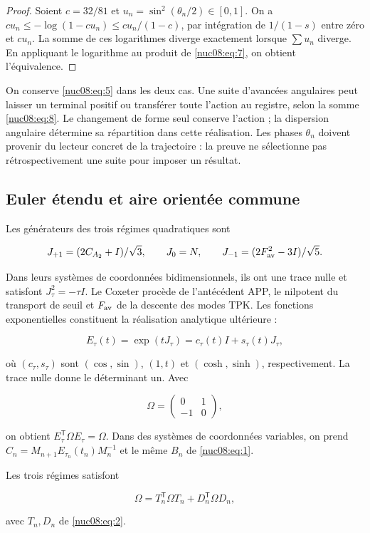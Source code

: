 \begin{proof}
Soient \(c=32/81\) et \(u_n=\sin^2(\theta_n/2)\in[0,1]\). On a
\(cu_n\leq-\log(1-cu_n)\leq cu_n/(1-c)\), par intégration de \(1/(1-s)\) entre zéro et \(cu_n\). La somme de ces logarithmes diverge exactement lorsque \(\sum u_n\) diverge. En appliquant le logarithme au produit de \eqref{nuc08:eq:7}, on obtient l’équivalence.
\end{proof}

On conserve \eqref{nuc08:eq:5} dans les deux cas. Une suite d’avancées angulaires peut laisser un terminal positif ou transférer toute l’action au registre, selon la somme \eqref{nuc08:eq:8}. Le changement de forme seul conserve l’action ; la dispersion angulaire détermine sa répartition dans cette réalisation. Les phases \(\theta_n\) doivent provenir du lecteur concret de la trajectoire : la preuve ne sélectionne pas rétrospectivement une suite pour imposer un résultat.

\subsection{Euler étendu et aire orientée commune
}

Les générateurs des trois régimes quadratiques sont


\[
J_{+1}=(2C_{A_2}+I)/\sqrt3,\qquad
J_0=N,\qquad
J_{-1}=(2F_{\rm av}^2-3I)/\sqrt5.
\]

Dans leurs systèmes de coordonnées bidimensionnels, ils ont une trace nulle et satisfont
\(J_\tau^2=-\tau I\). Le Coxeter procède de l’antécédent APP, le nilpotent du transport de seuil et \(F_{\rm av}\) de la descente des modes TPK. Les fonctions exponentielles constituent la réalisation analytique ultérieure :

\[
E_\tau(t)=\exp(tJ_\tau)=c_\tau(t)I+s_\tau(t)J_\tau,
\]

où \((c_\tau,s_\tau)\) sont \((\cos,\sin)\), \((1,t)\) et \((\cosh,\sinh)\), respectivement. La trace nulle donne le déterminant un. Avec

\[
\Omega=\begin{pmatrix}0&1\\-1&0\end{pmatrix},
\]

on obtient \(E_\tau^\mathsf T\Omega E_\tau=\Omega\). Dans des systèmes de coordonnées variables, on prend
\(C_n=M_{n+1}E_{\tau_n}(t_n)M_n^{-1}\) et le même \(B_n\) de \eqref{nuc08:eq:1}.

\begin{theorem}
Les trois régimes satisfont


\begin{equation}
\boxed{\Omega=T_n^\mathsf T\Omega T_n+D_n^\mathsf T\Omega D_n,}
\label{nuc08:eq:9}
\end{equation}

avec \(T_n,D_n\) de \eqref{nuc08:eq:2}.

\end{theorem}

